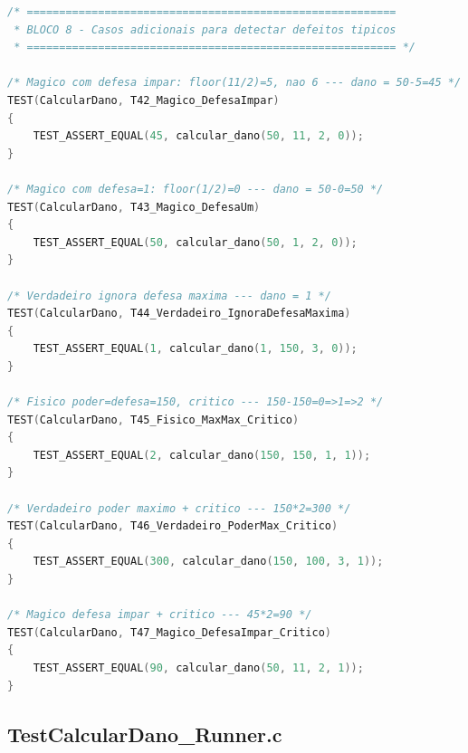 \documentclass[conference, onecolumn]{IEEEtran}
\begin{document}
\begin{lstlisting}[language=C, caption={TestCalcularDano.c --- suíte de 47 testes funcionais.}]
/* =========================================================
 * BLOCO 8 - Casos adicionais para detectar defeitos tipicos
 * ========================================================= */

/* Magico com defesa impar: floor(11/2)=5, nao 6 --- dano = 50-5=45 */
TEST(CalcularDano, T42_Magico_DefesaImpar)
{
    TEST_ASSERT_EQUAL(45, calcular_dano(50, 11, 2, 0));
}

/* Magico com defesa=1: floor(1/2)=0 --- dano = 50-0=50 */
TEST(CalcularDano, T43_Magico_DefesaUm)
{
    TEST_ASSERT_EQUAL(50, calcular_dano(50, 1, 2, 0));
}

/* Verdadeiro ignora defesa maxima --- dano = 1 */
TEST(CalcularDano, T44_Verdadeiro_IgnoraDefesaMaxima)
{
    TEST_ASSERT_EQUAL(1, calcular_dano(1, 150, 3, 0));
}

/* Fisico poder=defesa=150, critico --- 150-150=0=>1=>2 */
TEST(CalcularDano, T45_Fisico_MaxMax_Critico)
{
    TEST_ASSERT_EQUAL(2, calcular_dano(150, 150, 1, 1));
}

/* Verdadeiro poder maximo + critico --- 150*2=300 */
TEST(CalcularDano, T46_Verdadeiro_PoderMax_Critico)
{
    TEST_ASSERT_EQUAL(300, calcular_dano(150, 100, 3, 1));
}

/* Magico defesa impar + critico --- 45*2=90 */
TEST(CalcularDano, T47_Magico_DefesaImpar_Critico)
{
    TEST_ASSERT_EQUAL(90, calcular_dano(50, 11, 2, 1));
}
\end{lstlisting}

\subsection{TestCalcularDano\_Runner.c}
\end{document}
